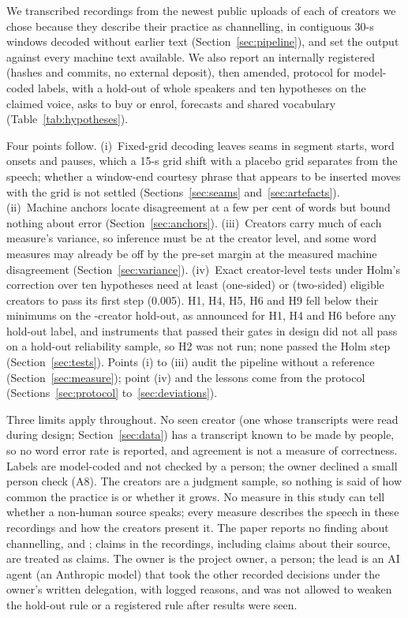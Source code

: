 We transcribed recordings from the newest \NPerCreator{} public uploads of each of \NCreators{} creators we chose because they describe their practice as channelling, in contiguous 30-s windows decoded without earlier text (Section~\ref{sec:pipeline}), and set the output against every machine text available. We also report an internally registered (hashes and commits, no external deposit), then amended, protocol for model-coded labels, with a hold-out of whole speakers and ten hypotheses on the claimed voice, asks to buy or enrol, forecasts and shared vocabulary (Table~\ref{tab:hypotheses}).

Four points follow. (i)~Fixed-grid decoding leaves seams in segment starts, word onsets and pauses, which a 15-s grid shift with a placebo grid separates from the speech; whether a window-end courtesy phrase that appears to be inserted moves with the grid is not settled (Sections~\ref{sec:seams} and~\ref{sec:artefacts}). (ii)~Machine anchors locate disagreement at a few per cent of words but bound nothing about error (Section~\ref{sec:anchors}). (iii)~Creators carry much of each measure's variance, so inference must be at the creator level, and some word measures may already be off by the pre-set margin at the measured machine disagreement (Section~\ref{sec:variance}). (iv)~Exact creator-level tests under Holm's correction over ten hypotheses need at least \MinCreatorsOneSided{} (one-sided) or \MinCreatorsTwoSided{} (two-sided) eligible creators to pass its first step (0.005). H1, H4, H5, H6 and H9 fell below their minimums on the \NHoldout{}-creator hold-out, as announced for H1, H4 and H6 before any hold-out label, and instruments that passed their gates in design did not all pass on a hold-out reliability sample, so H2 was not run; none passed the Holm step (Section~\ref{sec:tests}). Points (i) to (iii) audit the pipeline without a reference (Section~\ref{sec:measure}); point (iv) and the lessons come from the protocol (Sections~\ref{sec:protocol} to~\ref{sec:deviations}).

Three limits apply throughout. No seen creator (one whose transcripts were read during design; Section~\ref{sec:data}) has a transcript known to be made by people, so no word error rate is reported, and agreement is not a measure of correctness. Labels are model-coded and not checked by a person; the owner declined a small person check (A8). The creators are a judgment sample, so nothing is said of how common the practice is or whether it grows. No measure in this study can tell whether a non-human source speaks; every measure describes the speech in these recordings and how the creators present it. The paper reports no finding about channelling, and \ResIntro; claims in the recordings, including claims about their source, are treated as claims. The owner is the project owner, a person; the lead is an AI agent (an Anthropic model) that took the other recorded decisions under the owner's written delegation, with logged reasons, and was not allowed to weaken the hold-out rule or a registered rule after results were seen.
